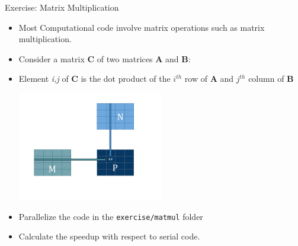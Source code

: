 \documentclass[10pt,t]{beamer}
\begin{document}
\begin{frame}{Exercise: Matrix Multiplication}
  \begin{itemize}
    \item Most Computational code involve matrix operations such as matrix multiplication.
    \item Consider a matrix {\bf C} of two matrices {\bf A} and {\bf B}:
    \item[] Element {\it i,j} of {\bf C} is the dot product of the $i^{th}$ row of {\bf A} and $j^{th}$ column of {\bf B}
      \begin{center}
        \includegraphics[width=0.5\textwidth]{./matmul}
      \end{center}
    \item Parallelize the code in the \texttt{exercise/matmul} folder
    \item Calculate the speedup with respect to serial code.
  \end{itemize}
%      
%      
\end{frame}
\end{document}

